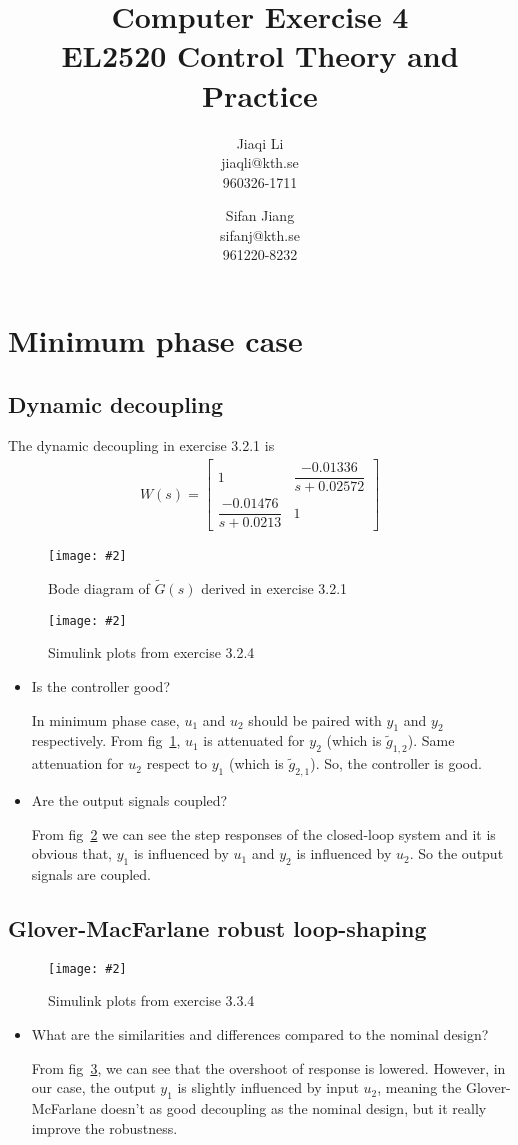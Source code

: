 \documentclass[11pt,a4paper]{article}
\title{
	Computer Exercise 4\\
	EL2520 Control Theory and Practice
}
\author{
	Jiaqi Li\\
	jiaqli@kth.se\\
	960326-1711
	\and
	Sifan Jiang\\
	sifanj@kth.se\\
	961220-8232
}
\newcommand{\image}[3]{
	\begin{figure}[!ht]
		\centering
	    \texttt{[image: \#2]}
		\caption{#3}
		\label{fig:#2}
	\end{figure}
}
\begin{document}
\maketitle


\section*{Minimum phase case}
\subsection*{Dynamic decoupling}
\par The dynamic decoupling in exercise 3.2.1 is
	\begin{align*}
		W(s) = \begin{bmatrix} 1 & \dfrac{-0.01336}{s+0.02572} \\ \dfrac{-0.01476}{s+0.0213} & 1 \end{bmatrix}
	\end{align*}
	
	\image{0.75}{321}{Bode diagram of $\tilde{G}(s)$ derived in exercise 3.2.1}
	\image{0.75}{324}{Simulink plots from exercise 3.2.4}

	\begin{itemize}
		\item Is the controller good?
		\par In minimum phase case, $u_{1}$ and $u_{2}$ should be paired with $y_{1}$ and $y_{2}$ respectively. From fig~\ref{fig:321}, $u_{1}$ is attenuated for $y_{2}$ (which is $\tilde{g}_{1,2}$). Same attenuation for $u_{2}$ respect to $y_{1}$ (which is $\tilde{g}_{2,1}$). So, the controller is good.
		
		\item Are the output signals coupled?
		\par From fig~\ref{fig:324} we can see the step responses of the closed-loop system and it is obvious that, $y_{1}$ is influenced by $u_{1}$ and $y_{2}$ is influenced by $u_{2}$. So the output signals are coupled.
	\end{itemize}

\subsection*{Glover-MacFarlane robust loop-shaping}
	\image{0.75}{334}{Simulink plots from exercise 3.3.4}

	\begin{itemize}
		\item What are the similarities and differences compared to the nominal design?
		\par From fig~\ref{fig:334}, we can see that the overshoot of response is lowered. However, in our case, the output $y_{1}$ is slightly influenced by input $u_{2}$, meaning the Glover-McFarlane doesn't as good decoupling as the nominal design, but it really improve the robustness.
	\end{itemize}
\end{document}
